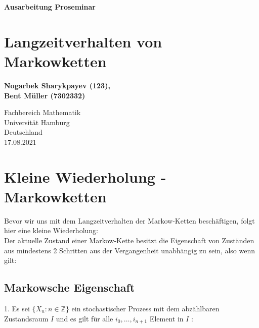 \documentclass[a4paper]{article}
\begin{document}
\begin{titlepage}
   \begin{center}
       \vspace*{1cm}

       \textbf{Ausarbeitung Proseminar}

       \vspace{0.5cm}
	   \section*{
		   Langzeitverhalten von Markowketten
	   }
            
       \vspace{1.5cm}

	   \textbf{Nogarbek Sharykpayev (123),\\ Bent Müller (7302332)}

       \vfill
            
       \vspace{0.8cm}
     
            
       Fachbereich Mathematik\\
       Universität Hamburg\\
       Deutschland\\
       17.08.2021
            
   \end{center}
\end{titlepage}

\pagebreak
\tableofcontents
\pagebreak

\section{Kleine Wiederholung - Markowketten}

Bevor wir uns mit dem Langzeitverhalten der Markow-Ketten beschäftigen, folgt hier eine kleine Wiederholung:
\\

Der aktuelle Zustand einer Markow-Kette besitzt die Eigenschaft von Zuständen aus mindestens 2 Schritten aus der Vergangenheit unabhängig zu sein, also wenn gilt:

\subsection{Markowsche Eigenschaft}

1. Es sei $\{X_n : n \in \mathbb{Z} \}$ ein stochastischer Prozess mit dem abzählbaren Zustandsraum $I$ und es gilt für alle $i_0, …, i_{n+1}$ Element in $I$ : 
\end{document}
